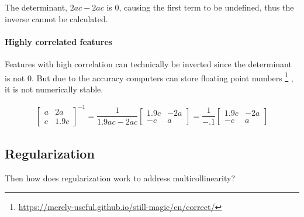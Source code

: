 \documentclass[10pt,letterpaper,twoside]{article}
\begin{document}
The determinant, $2ac - 2ac$ is 0, causing the first term to be undefined,
thus the inverse cannot be calculated.

\paragraph{Highly correlated features}

Features with high correlation can technically be inverted since the determinant is not 0.
But due to the accuracy computers can store floating point numbers
\footnote{\url{https://merely-useful.github.io/still-magic/en/correct/}}
,
it is not numerically stable.

\begin{align}
\begin{bmatrix}
a & 2a \\
c & 1.9c
\end{bmatrix}^{-1}
=
\dfrac{1}{1.9ac - 2ac}
\begin{bmatrix}
1.9c & -2a \\
-c & a
\end{bmatrix}
=
\dfrac{1}{-.1}
\begin{bmatrix}
1.9c & -2a \\
-c & a
\end{bmatrix}
\end{align}

\subsection{Regularization}

Then how does regularization work to address multicollinearity?
\end{document}
